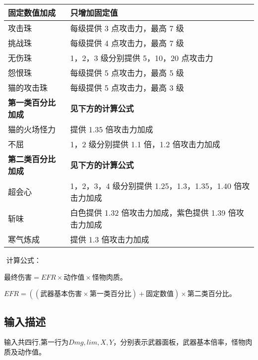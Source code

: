 \begin{table}[H]
\begin{tabularx}{\textwidth}{|X|X|}
\hline
{ \textbf{固定数值加成}}   & { \textbf{只增加固定值}}                         \\ \hline
{ 攻击珠}               & { 每级提供 3 点攻击力，最高 7 级}                      \\ \hline
{ 挑战珠}               & { 每级提供 4 点攻击力，最高 7 级}                      \\ \hline
{ 无伤珠}               & { 1，2，3 级分别提供 5，10，20 点攻击力}                \\ \hline
{ 怨恨珠}               & { 每级提供 5 点攻击力，最高 5 级}                      \\ \hline
{ 猫的攻击珠}             & { 每级提供 5 点攻击力，最高 3 级}                      \\ \hline
{ \textbf{第一类百分比加成}} & { \textbf{见下方的计算公式}}                       \\ \hline
{ 猫的火场怪力}            & { 提供 1.35 倍攻击力加成}                          \\ \hline
{ 不屈}                & { 1，2 级分别提供 1.1 倍，1.2 倍攻击力加成}              \\ \hline
{ \textbf{第二类百分比加成}} & { \textbf{见下方的计算公式}}                       \\ \hline
{ 超会心}               & { 1，2，3，4 级分别提供 1.25，1.3，1.35，1.40 倍攻击力加成} \\ \hline
{ 斩味}                & { 白色提供 1.32 倍攻击力加成，紫色提供 1.39 倍攻击力加成}       \\ \hline
{ 寒气炼成}              & { 提供 1.3 倍攻击力加成}                           \\ \hline
\end{tabularx}
\end{table}

​		计算公式：

​		$\texttt{最终伤害}=EFR\times \texttt{动作值} \times \texttt{怪物肉质}$。

​		$EFR = (( \texttt{武器基本伤害}\times \texttt{第一类百分比})+ \texttt{固定数值})\times \texttt{第二类百分比}$。

\subsection*{输入描述}

输入共四行,第一行为$Dmg,lim,X,Y$，分别表示武器面板，武器基本倍率，怪物肉质及动作值。

